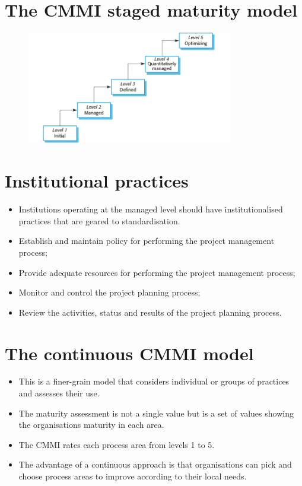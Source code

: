 \section{The CMMI staged maturity model}
\begin{figure}[h!]
    \centering
    \includegraphics[width = 0.8\textwidth]{./figures/L9_5.png}
    \caption{}
    \label{fig:L9_5}
\end{figure}

\section{Institutional practices}
\begin{itemize}




\item Institutions operating at the managed level should have institutionalised practices that are geared to standardisation.

   \item Establish and maintain policy for performing the project management process;
   \item Provide adequate resources for performing the project management process;
   \item Monitor and control the project planning process;
   \item Review the activities, status and results of the project planning process.

\end{itemize}

\section{The continuous CMMI model}
\begin{itemize}
\item This is a finer-grain model that considers individual or groups of practices and assesses their use.

\item The maturity assessment is not a single value but is a set of values showing the organisations maturity in each area.

\item The CMMI rates each process area from levels 1 to 5.

\item The advantage of a continuous approach is that organisations can pick and choose process areas to improve according to their local needs.

\end{itemize}

